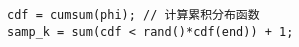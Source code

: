 \documentclass[master,openright,oneside,color]{../buaathesis}
\begin{document}
\begin{verbatim}
cdf = cumsum(phi); // 计算累积分布函数
samp_k = sum(cdf < rand()*cdf(end)) + 1;
\end{verbatim}
\end{document}
